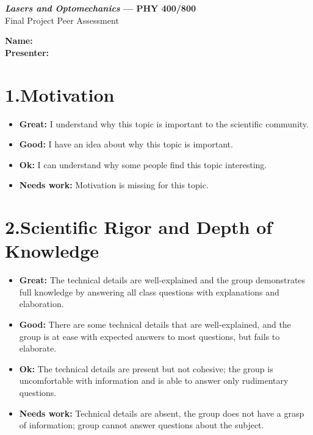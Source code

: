 \documentclass[12pt]{article}
\newcommand{\rubricitem}[2]{\textbf{#1:} #2}
\begin{document}
\begin{center}
    {\LARGE\bfseries \textit{Lasers and Optomechanics} --- PHY 400/800 }\\[0.5em]
    {\normalsize Final Project Peer Assessment}\\[0.2em]
\end{center}

\vspace{1em}

\noindent\textbf{Name:} \\[1em]
\noindent\textbf{Presenter:} 

\vspace{1.5em}

\section*{1.\quad Motivation}

\begin{itemize}[leftmargin=1.5em, itemsep=0.4em]
    \item[$\square$] \rubricitem{Great}{I understand why this topic is important to the scientific community.}
    \item[$\square$] \rubricitem{Good}{I have an idea about why this topic is important.}
    \item[$\square$] \rubricitem{Ok}{I can understand why some people find this topic interesting.}
    \item[$\square$] \rubricitem{Needs work}{Motivation is missing for this topic.}
\end{itemize}

\section*{2.\quad Scientific Rigor and Depth of Knowledge}

\begin{itemize}[leftmargin=1.5em, itemsep=0.4em]
    \item[$\square$] \rubricitem{Great}{The technical details are well-explained and the group demonstrates full knowledge by answering all class questions with explanations and elaboration.}
    \item[$\square$] \rubricitem{Good}{There are some technical details that are well-explained, and the group is at ease with expected answers to most questions, but fails to elaborate.}
    \item[$\square$] \rubricitem{Ok}{The technical details are present but not cohesive; the group is uncomfortable with information and is able to answer only rudimentary questions.}
    \item[$\square$] \rubricitem{Needs work}{Technical details are absent, the group does not have a grasp of information; group cannot answer questions about the subject.}
\end{itemize}
\end{document}
